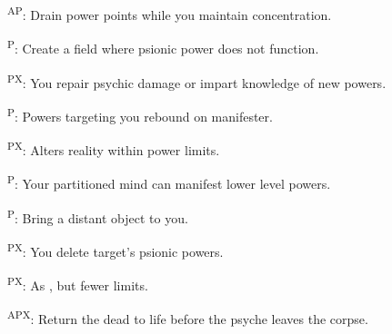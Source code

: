 \begin{enumerate*}
      \textsuperscript{AP}: Drain power points while you maintain concentration. %

\item {}\textsuperscript{P}: Create a field where psionic power does not function. %

\item {}\textsuperscript{PX}: You repair psychic damage or impart knowledge of new powers. %

      \textsuperscript{P}: Powers targeting you rebound on manifester. %

\item {}\textsuperscript{PX}: Alters reality within power limits. %

      \textsuperscript{P}: Your partitioned mind can manifest lower level powers. %

      \textsuperscript{P}: Bring a distant object to you.

\item {}\textsuperscript{PX}: You delete target's psionic powers. %


      \textsuperscript{PX}: As , but fewer limits. %

      \textsuperscript{APX}: Return the dead to life before the psyche leaves the corpse.
\end{enumerate*}



